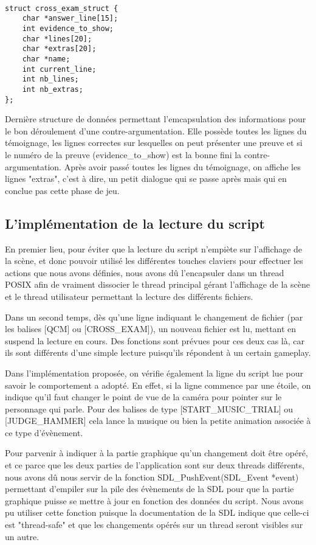 \begin{verbatim}

struct cross_exam_struct {
	char *answer_line[15];
	int evidence_to_show;
	char *lines[20];
	char *extras[20];
	char *name;
	int current_line;
	int nb_lines;
	int nb_extras;
};

\end{verbatim}

	Dernière structure de données permettant l'emcapsulation des informations pour le bon déroulement d'une contre-argumentation. Elle possède toutes les lignes du témoignage, les lignes correctes sur lesquelles on peut présenter une preuve et si le numéro de la preuve (evidence\_to\_show) est la bonne fini la contre-argumentation. Après avoir passé toutes les lignes du témoignage, on affiche les lignes "extras", c'est à dire, un petit dialogue qui se passe après mais qui en conclue pas cette phase de jeu.
	
\subsection{L'implémentation de la lecture du script}
	
	En premier lieu, pour éviter que la lecture du script n'empiète sur l'affichage de la scène, et donc pouvoir utilisé les différentes touches claviers pour effectuer les actions que nous avons définies, nous avons dû l'encapsuler dans un thread POSIX afin de vraiment dissocier le thread principal gérant l'affichage de la scène et le thread utilisateur permettant la lecture des différents fichiers.\newline
	
	Dans un second temps, dès qu'une ligne indiquant le changement de fichier (par les balises [QCM] ou [CROSS\_EXAM]), un nouveau fichier est lu, mettant en suspend la lecture en cours. Des fonctions sont prévues pour ces deux cas là, car ils sont différents d'une simple lecture puisqu'ils répondent à un certain gameplay.\newline
	
	Dans l'implémentation proposée, on vérifie également la ligne du script lue pour savoir le comportement a adopté. En effet, si la ligne commence par une étoile, on indique qu'il faut changer le point de vue de la caméra pour pointer sur le personnage qui parle.\newline
	Pour des balises de type [START\_MUSIC\_TRIAL] ou [JUDGE\_HAMMER] cela lance la musique ou bien la petite animation associée à ce type d'évènement.\newline
	
	Pour parvenir à indiquer à la partie graphique qu'un changement doit être opéré, et ce parce que les deux parties de l'application sont sur deux threads différents, nous avons dû nous servir de la fonction SDL\_PushEvent(SDL\_Event *event) permettant d'empiler sur la pile des évènements de la SDL pour que la partie graphique puisse se mettre à jour en fonction des données du script. Nous avons pu utiliser cette fonction puisque la documentation de la SDL indique que celle-ci est "thread-safe" et que les changements opérés sur un thread seront visibles sur un autre.